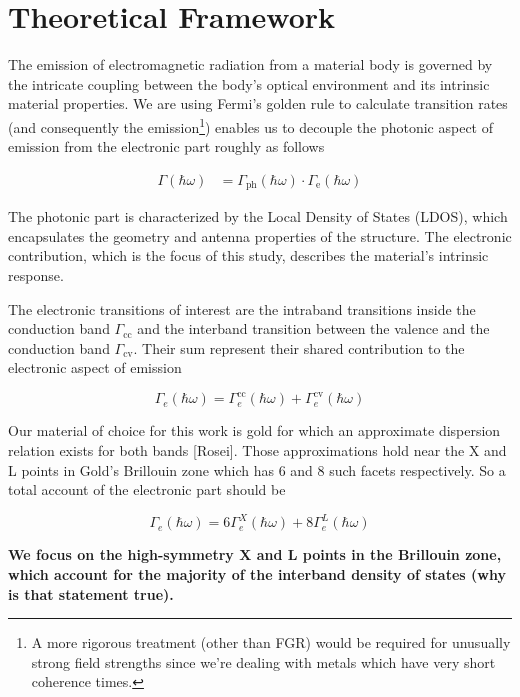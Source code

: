\newpage
\section{Theoretical Framework}
\label{sec:theoretical_framework}

The emission of electromagnetic radiation from a material body is governed by the intricate coupling between the body's optical environment and its intrinsic material properties. We are using Fermi's golden rule to calculate transition rates (and consequently the emission\footnote{A more rigorous treatment (other than FGR) would be required for unusually strong field strengths since we're dealing with metals which have very short coherence times.}) enables us to decouple the photonic aspect of emission from the electronic part roughly as follows

\begin{align}
\Gamma(\hbar\omega) &= \Gamma_{\text{ph}}(\hbar\omega)\cdot \Gamma_{\text{e}}(\hbar\omega)
\label{eq:theoretical_framework_gamma_split}
\end{align}

The photonic part is characterized by the Local Density of States (LDOS), which encapsulates the geometry and antenna properties of the structure. The electronic contribution, which is the focus of this study, describes the material's intrinsic response.

The electronic transitions of interest are the intraband transitions inside the conduction band $\Gamma_{\text{cc}}$ and the interband transition between the valence and the conduction band $\Gamma_{\text{cv}}$. Their sum represent their shared contribution to the electronic aspect of emission

\begin{equation}
\Gamma_{e}(\hbar \omega) = \Gamma_{e}^{\text{cc}}(\hbar \omega) + \Gamma_{e}^{\text{cv}}(\hbar \omega)
\label{eq:theoretical_framework_gamma_sum}
\end{equation}

Our material of choice for this work is gold for which an approximate dispersion relation exists for both bands [Rosei]. Those approximations hold near the X and L points in Gold's Brillouin zone which has 6 and 8 such facets respectively. So a total account of the electronic part should be

\begin{equation}
\Gamma_{e}(\hbar\omega) = 6\Gamma_{e}^{X}(\hbar\omega)+8\Gamma_{e}^{L}(\hbar\omega)
\label{eq:theoretical_framework_gamma_xl}
\end{equation}

\textbf{We focus on the high-symmetry X and L points in the Brillouin zone, which account for the majority of the interband density of states (why is that statement true).}



